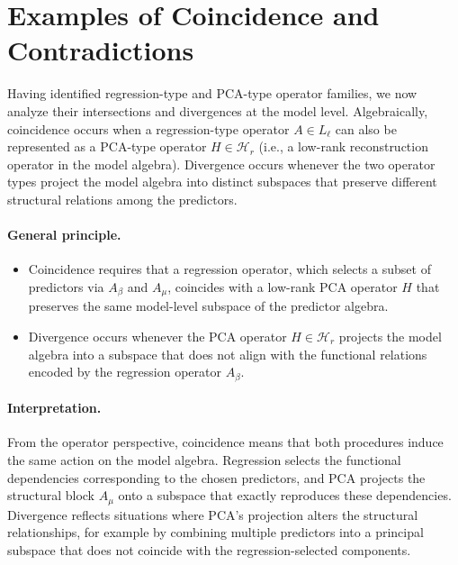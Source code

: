 \section{Examples of Coincidence and Contradictions}


Having identified regression-type and PCA-type operator families, we now analyze their intersections and divergences at the model level. Algebraically, coincidence occurs when a regression-type operator $A \in L_\ell$ can also be represented as a PCA-type operator $H \in \mathcal{H}_r$ (i.e., a low-rank reconstruction operator in the model algebra). Divergence occurs whenever the two operator types project the model algebra into distinct subspaces that preserve different structural relations among the predictors.

\paragraph{General principle.}  
\begin{itemize}
    \item Coincidence requires that a regression operator, which selects a subset of predictors via $A_\beta$ and $A_\mu$, coincides with a low-rank PCA operator $H$ that preserves the same model-level subspace of the predictor algebra.
    \item Divergence occurs whenever the PCA operator $H \in \mathcal{H}_r$ projects the model algebra into a subspace that does not align with the functional relations encoded by the regression operator $A_\beta$.
\end{itemize}

\paragraph{Interpretation.}
From the operator perspective, coincidence means that both procedures induce the same action on the model algebra. Regression selects the functional dependencies corresponding to the chosen predictors, and PCA projects the structural block $A_\mu$ onto a subspace that exactly reproduces these dependencies. Divergence reflects situations where PCA’s projection alters the structural relationships, for example by combining multiple predictors into a principal subspace that does not coincide with the regression-selected components.

